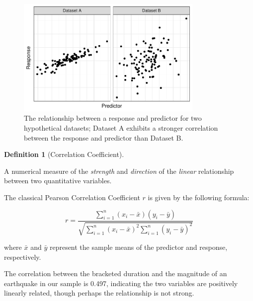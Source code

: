 \documentclass[
  letterpaper,
  DIV=11,
  numbers=noendperiod]{scrreprt}
\theoremstyle{plain}
\theoremstyle{definition}
\theoremstyle{definition}
\newtheorem{definition}{Definition}[chapter]
\theoremstyle{remark}
\begin{document}
\begin{figure}

{\centering \includegraphics[width=0.8\textwidth,height=\textheight]{./images/fig-regsummaries-correlation-1.pdf}

}

\caption{\label{fig-regsummaries-correlation}The relationship between a
response and predictor for two hypothetical datasets; Dataset A exhibits
a stronger correlation between the response and predictor than Dataset
B.}

\end{figure}

\begin{definition}[Correlation
Coefficient]\protect\hypertarget{def-correlation-coefficient}{}\label{def-correlation-coefficient}

A numerical measure of the \emph{strength} and \emph{direction} of the
\emph{linear} relationship between two quantitative variables.

The classical Pearson Correlation Coefficient \(r\) is given by the
following formula:

\[r = \frac{\sum_{i=1}^{n} \left(x_i - \bar{x}\right)\left(y_i - \bar{y}\right)}{\sqrt{\sum_{i=1}^n \left(x_i - \bar{x}\right)^2 \sum_{i=1}^n \left(y_i - \bar{y}\right)^2}}\]

where \(\bar{x}\) and \(\bar{y}\) represent the sample means of the
predictor and response, respectively.

\end{definition}

The correlation between the bracketed duration and the magnitude of an
earthquake in our sample is 0.497, indicating the two variables are
positively linearly related, though perhaps the relationship is not
strong.
\end{document}
